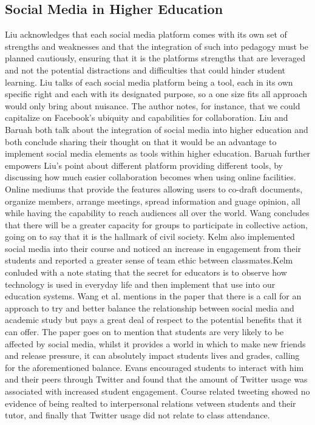 \documentclass[lettersize,journal]{IEEEtran}
\begin{document}
\subsection{Social Media in Higher Education}
    Liu \cite{Liu2010}  acknowledges that each social media platform comes with
    its own set of strengths and weaknesses and that the integration of such into
    pedagogy must be planned cautiously, ensuring that it is the platforms strengths
    that are leveraged and not the potential distractions and difficulties that could
    hinder student learning. Liu talks of each social media platform being a tool,
    each in its own specific right and each with its designated purpose, so a one size
    fits all approach would only bring about nuisance. The author notes, for instance,
    that we could capitalize on Facebook's ubiquity and capabilities for collaboration.
    Liu \cite{Liu2010} and Baruah \cite{Baruah2012} both talk about the integration of
    social media into higher education and both conclude sharing their thought on that
    it would be an advantage to implement social media elements as tools within higher
    education. Baruah further empowers Liu's point about different platform providing
    different tools, by discussing how much easier collaboration becomes when using
    online facilities. Online mediums that provide the features allowing users to co-draft
    documents, organize members, arrange meetings, spread information and guage opinion,
    all while having the capability to reach audiences all over the world.
    Wang concludes that there will be a greater capacity for groups to participate in
    collective action, going on to say that it is the hallmark of civil society.
    Kelm \cite{Kelm2011} also implemented social media into their course and noticed an
    increase in engagement from their students and reported a greater sense of team ethic
    between classmates.Kelm conluded with a note stating that the secret for educators is
    to observe how technology is used in everyday life and then implement that use into
    our education systems.
    Wang et al. \cite{Wang2011} mentions in the paper that there is a call for an approach
    to try and better balance the relationship between social media and academic study but
    pays a great deal of respect to the potential benefits that it can offer. The paper goes
    on to mention that students are very likely to be affected by social media, whilst it
    provides a world in which to make new friends and release pressure, it can absolutely
    impact students lives and grades, calling for the aforementioned balance.
    Evans \cite{Evans2014} encouraged students to interact with him and their peers through
    Twitter and found that the amount of Twitter usage was associated with increased student
    engagement. Course related tweeting showed no evidence of being realted to interpersonal
    relations vetween students and their tutor, and finally that Twitter usage did not relate
    to class attendance.
\end{document}
